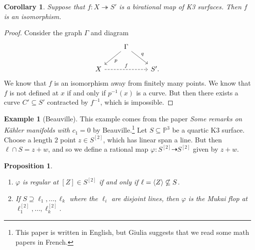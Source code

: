 \documentclass[leqno, openany]{memoir}
\newtheorem{cor}[thm]{Corollary}
\newtheorem{prop}[thm]{Proposition}
\theoremstyle{definition}
\newtheorem{exm}[thm]{Example}
\theoremstyle{remark}
\theoremstyle{plain}
\theoremstyle{definition}
\theoremstyle{remark}
\renewcommand{\P}{\mathbb{P}}
\begin{document}
\begin{cor}
    Suppose that $f \colon X \twoheadrightarrow S'$ is a birational map of K3 surfaces. Then $f$ is an isomorphism.
\end{cor}

\begin{proof}
    Consider the graph $\Gamma$ and diagram
    \begin{equation*}
    \begin{tikzcd}
        & \Gamma \ar{dl}{p} \ar{dr}{q} \\
        X \ar[dashrightarrow]{rr}{f} & & S'.
    \end{tikzcd}
    \end{equation*}
    We know that $f$ is an isomorphism away from finitely many points. We know that $f$ is not defined at $x$ if and only if $p^{-1}(x)$ is a curve. But then there exists a curve $C' \subseteq S'$ contracted by $f^{-1}$, which is impossible.
\end{proof}

\begin{exm}[Beauville]
    This example comes from the paper \textit{Some remarks on K\"ahler manifolds with $c_1 = 0$} by Beauville.\footnote{This paper is written in English, but Giulia suggests that we read some math papers in French.} Let $S \subseteq \P^3$ be a quartic K3 surface. Choose a length $2$ point $z \in S^{[2]}$, which has linear span a line. But then $\ell \cap S = z + w$, and so we define a rational map $\varphi \colon S^{[2]} \dashrightarrow S^{[2]}$ given by $z + w$.
\end{exm}

\begin{prop}\leavevmode
    \begin{enumerate}
        \item $\varphi$ is regular at $[Z] \in S^{[2]}$ if and only if $\ell = \ev{Z} \not\subseteq S$.
        \item If $S \supseteq \ell_1, \ldots, \ell_k$ where the $\ell_i$ are disjoint lines, then $\varphi$ is the Mukai flop at $\ell_1^{[2]}, \ldots, \ell_k^{[2]}$.
    \end{enumerate}
\end{prop}
\end{document}
